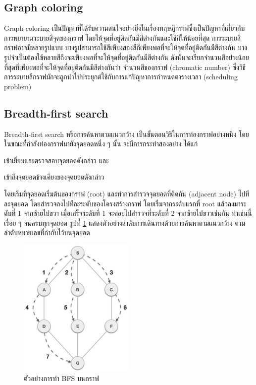 \subsection{Graph coloring}
 
Graph coloring เป็นปัญหาที่ได้รับความสนใจอย่างยิ่งในเรื่องทฤษฎีกราฟซึ่งเป็นปัญหาที่เกี่ยวกับการพยายามระบายสีจุดของกราฟ โดยให้จุดที่อยู่ติดกันมีสีต่างกันและใช้สีให้น้อยที่สุด
การระบายสีกราฟอาจมีหลายรูปแบบ บางรูปสามารถใช้สีเพียงสองสีก็เพียงพอที่จะให้จุดที่อยู่ติดกันมีสีต่างกัน บางรูปจำเป็นต้องใช้หลายสีถึงจะเพียงพอที่จะให้จุดที่อยู่ติดกันมีสีต่างกัน 
ดังนั้นจะเรียกจำนวนสีอย่างน้อยที่สุดที่เพียงพอที่จะให้จุดที่อยู่ติดกันมีสีต่างกันว่า จำนวนสีของกราฟ (chromatic number) ซึ่งวิธีการระบายสีกราฟมักจะถูกนำไปประยุกต์ใช้กับการแก้ปัญหาการกำหนดตารางเวลา (scheduling problem) 

\subsection{Breadth-first search}
Breadth-first search หรือการค้นหาตามแนวกว้าง เป็นขั้นตอนวิธีในการท่องกราฟอย่างหนึ่ง โดยในขณะที่กำลังท่องกราฟมายังจุดยอดหนึ่ง ๆ นั้น จะมีการกระทำสองอย่าง ได้แก่
\begin{enumerate*}[label=(\arabic*)]
  \item เข้าเยี่ยมและตรวจสอบจุดยอดดังกล่าว และ
  \item เข้าถึงจุดยอดข้างเคียงของจุดยอดดังกล่าว
\end{enumerate*}
โดยเริ่มที่จุดยอดเริ่มต้นของกราฟ (root) และทำการสำรวจจุดยอดที่ติดกัน (adjacent node) ไปทีละจุดยอด
โดยสำรวจลงไปทีละระดับของโครงสร้างกราฟ โดยเริ่มจากระดับแรกที่ root แล้วลงมาระดับที่ 1 จากซ้ายไปขวา เมื่อเสร็จระดับที่ 1 จะค่อยไปสำรวจที่ระดับที่ 2 จากซ้ายไปขวาเช่นกัน ทําเช่นนี้เรื่อย ๆ 
จนครบทุกจุดยอด
รูปที่ \ref{fig:graph_bfs} แสดงตัวอย่างลําดับการเดินทางด้วยการค้นหาตามแนวกว้าง ตามลำดับหมายเลขที่กํากับไว้บนจุดยอด
%
\begin{figure}
  \begin{center}
    \includegraphics[width=0.5\textwidth]{images/breadth_first_traversal.jpg}
  \end{center}
  \caption[ตัวอย่างการทำ BFS บนกราฟ]{ตัวอย่างการทำ BFS บนกราฟ}
  \label{fig:graph_bfs}     
\end{figure}
